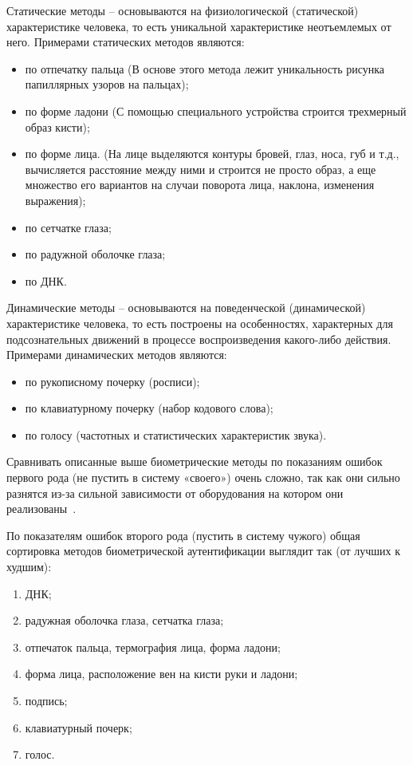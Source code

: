 Статические методы -- основываются на физиологической (статической) характеристике человека, то есть уникальной характеристике неотъемлемых от него.
Примерами статических методов являются:
\begin{itemize}
  \item по отпечатку пальца (В основе этого метода лежит уникальность рисунка папиллярных узоров на пальцах);
  \item по форме ладони (С помощью специального устройства строится трехмерный образ кисти);
  \item по форме лица. (На лице выделяются контуры бровей, глаз, носа, губ и т.д., вычисляется расстояние между ними и строится не просто образ, а еще множество его вариантов на случаи поворота лица, наклона, изменения выражения);
  \item по сетчатке глаза;
  \item по радужной оболочке глаза;
  \item по ДНК.
\end{itemize}

Динамические методы -- основываются на поведенческой (динамической) характеристике человека, то есть построены на особенностях, характерных для подсознательных движений в процессе воспроизведения какого-либо действия.
Примерами динамических методов являются:
\begin{itemize}
  \item по рукописному почерку (росписи);
  \item по клавиатурному почерку (набор кодового слова);
  \item по голосу (частотных и статистических характеристик звука).
\end{itemize}
Сравнивать описанные выше биометрические методы по показаниям ошибок первого рода (не пустить в систему «своего») очень сложно, так как они сильно разнятся из-за сильной зависимости от оборудования на котором они реализованы~\cite{lorette_plamondon}.

По показателям ошибок второго рода (пустить в систему чужого) общая сортировка методов биометрической аутентификации выглядит так (от лучших к худшим):
\begin{enumerate}
  \item ДНК;
  \item радужная оболочка глаза, сетчатка глаза;
  \item отпечаток пальца, термография лица, форма ладони;
  \item форма лица, расположение вен на кисти руки и ладони;
  \item подпись;
  \item клавиатурный почерк;
  \item голос.
\end{enumerate}


